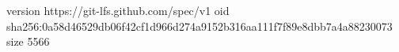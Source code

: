 version https://git-lfs.github.com/spec/v1
oid sha256:0a58d46529db06f42cf1d966d274a9152b316aa111f7f89e8dbb7a4a88230073
size 5566

